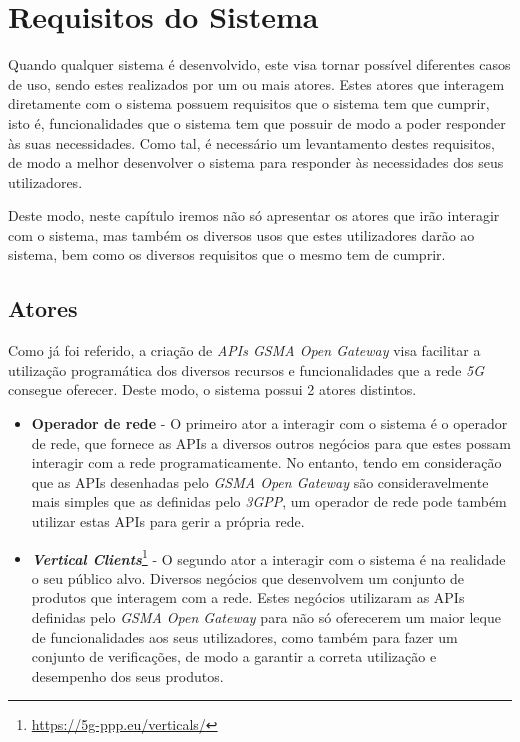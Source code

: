 \chapter{Requisitos do Sistema}

Quando qualquer sistema é desenvolvido, este visa tornar possível diferentes casos de uso, sendo estes realizados por um ou mais atores.
Estes atores que interagem diretamente com o sistema possuem requisitos que o sistema tem que cumprir, isto é, funcionalidades que
o sistema tem que possuir de modo a poder responder às suas necessidades. Como tal, é necessário um levantamento destes requisitos, de modo
a melhor desenvolver o sistema para responder às necessidades dos seus utilizadores.

Deste modo, neste capítulo iremos não só apresentar os atores que irão interagir com o sistema, mas também os diversos usos que estes
utilizadores darão ao sistema, bem como os diversos requisitos que o mesmo tem de cumprir.

\section{Atores}

Como já foi referido, a criação de \emph{APIs GSMA Open Gateway} visa facilitar a utilização programática dos diversos recursos e
funcionalidades que a rede \emph{5G} consegue oferecer. Deste modo, o sistema possui 2 atores distintos.
\begin{itemize}
  \item \textbf{Operador de rede} - O primeiro ator a interagir com o sistema é o operador de rede,
    que fornece as APIs a diversos outros negócios para que estes possam interagir com a rede programaticamente. No entanto, tendo em
    consideração que as APIs desenhadas pelo \emph{GSMA Open Gateway} são consideravelmente mais simples que as definidas pelo \emph{3GPP},
    um operador de rede pode também utilizar estas APIs para gerir a própria rede.

  \item \textbf{\emph{Vertical Clients}}\footnote{\url{https://5g-ppp.eu/verticals/}} - O segundo ator a interagir com o sistema é na realidade o seu público alvo. Diversos negócios
    que desenvolvem um conjunto de produtos que interagem com a rede. Estes negócios utilizaram as APIs definidas pelo \emph{GSMA Open Gateway}
    para não só oferecerem um maior leque de funcionalidades aos seus utilizadores, como também para fazer um conjunto de verificações, de modo
    a garantir a correta utilização e desempenho dos seus produtos.
\end{itemize}

